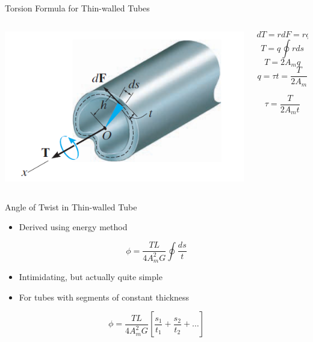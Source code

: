\documentclass[10pt, svgnames]{beamer}
\begin{document}
\begin{frame}[label={sec:orgee194d5}]{Torsion Formula for Thin-walled Tubes}
\begin{columns}
\begin{column}{0.6\columnwidth}
\begin{center}
\begin{center}
\includegraphics[width=.9\linewidth]{./pictures/thin-walled-torsion-formula.png}
\end{center}
\end{center}
\end{column}

\begin{column}{0.4\columnwidth}
\[dT = rdF = rqds\] \[T = q \oint rds\] \[T = 2 A_m q\]
\[q = \tau t = \frac{T}{2A_m}\]

\[\tau = \frac{T}{2A_m t}\]
\end{column}
\end{columns}
\end{frame}

\begin{frame}[label={sec:orgffff6c7}]{Angle of Twist in Thin-walled Tube}
\begin{itemize}
\item Derived using energy method
\end{itemize}

\[\phi = \frac{TL}{4A_m^2 G} \oint \frac{ds}{t}\]

\begin{itemize}
\item Intimidating, but actually quite simple

\item For tubes with segments of constant thickness
\end{itemize}

\[\phi = \frac{TL}{4A_m^2 G} \left[ \frac{s_1}{t_1} + \frac{s_2}{t_2} + \ldots \right]\]
\end{frame}
\end{document}
